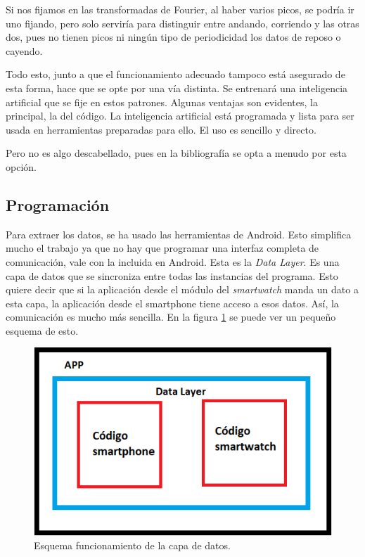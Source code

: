 \documentclass[12pt]{article}
\numberwithin{equation}{section}
\begin{document}
{Si nos fijamos en las transformadas de Fourier, al haber varios picos,  se podría ir uno fijando, pero solo serviría para distinguir entre andando, corriendo y las otras dos, pues no tienen picos ni ningún tipo de periodicidad los datos de reposo o cayendo. 

Todo esto, junto a que el funcionamiento adecuado tampoco está asegurado de esta forma, hace que se opte por una vía distinta. Se entrenará una inteligencia artificial que se fije en estos patrones. Algunas ventajas son evidentes, la principal, la del código. La inteligencia artificial está programada y lista para ser usada en herramientas preparadas para ello. El uso es sencillo y directo.

Pero no es algo descabellado, pues en la bibliografía\cite{s150818901} se opta a menudo por esta opción.


\newpage

\newpage
\subsection{Programación}

Para extraer los datos, se ha usado las herramientas de Android. Esto simplifica mucho el trabajo ya que no hay que programar una interfaz completa de comunicación, vale con la incluida en Android. Esta es la \textit{Data Layer}. Es una capa de datos que se sincroniza entre todas las instancias del programa. Esto quiere decir que si la aplicación desde el módulo del \textit{smartwatch} manda un dato a esta capa, la aplicación desde el smartphone tiene acceso a esos datos. Así, la comunicación es mucho más sencilla. En la figura \ref{fig:datalayer} se puede ver un pequeño esquema de esto.

\begin{figure}[h]
    \centering
    \includegraphics[width=1\textwidth]{esquemacodigo.png}
    \caption{Esquema funcionamiento de la capa de datos.}
    \label{fig:datalayer}
\end{figure}


}
\end{document}
